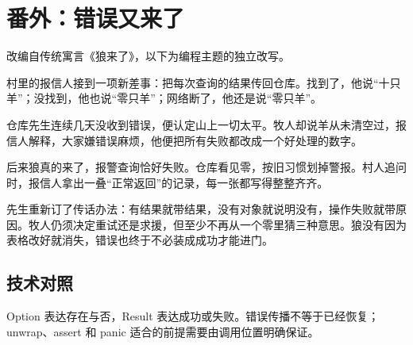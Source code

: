\section{番外：错误又来了}

改编自传统寓言《狼来了》，以下为编程主题的独立改写。

村里的报信人接到一项新差事：把每次查询的结果传回仓库。找到了，他说“十只羊”；没找到，他也说“零只羊”；网络断了，他还是说“零只羊”。

仓库先生连续几天没收到错误，便认定山上一切太平。牧人却说羊从未清空过，报信人解释，大家嫌错误麻烦，他便把所有失败都改成一个好处理的数字。

后来狼真的来了，报警查询恰好失败。仓库看见零，按旧习惯划掉警报。村人追问时，报信人拿出一叠“正常返回”的记录，每一张都写得整整齐齐。

先生重新订了传话办法：有结果就带结果，没有对象就说明没有，操作失败就带原因。牧人仍须决定重试还是求援，但至少不再从一个零里猜三种意思。狼没有因为表格改好就消失，错误也终于不必装成成功才能进门。

\subsection*{技术对照}

Option 表达存在与否，Result 表达成功或失败。错误传播不等于已经恢复；unwrap、assert 和 panic 适合的前提需要由调用位置明确保证。
